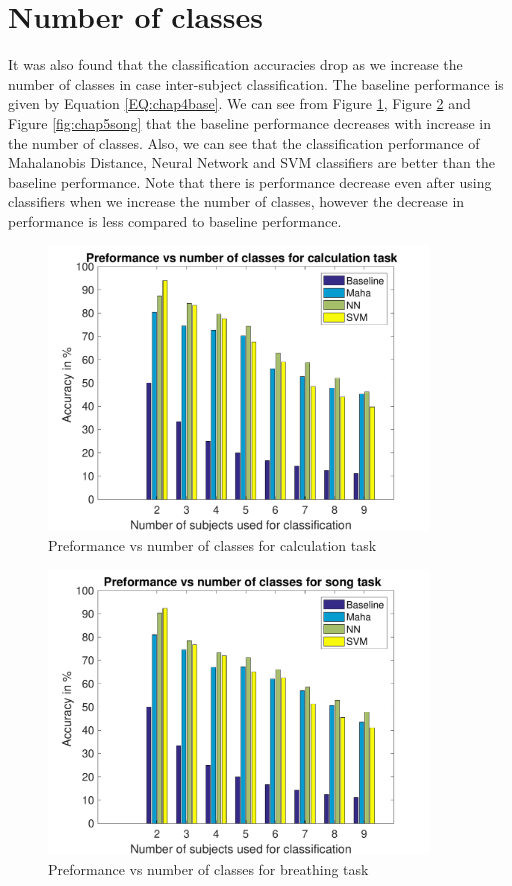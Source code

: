	\section{Number of classes}
		It was also found that the classification accuracies drop as we increase the number of classes in case inter-subject classification. The baseline performance is given by Equation \ref{EQ:chap4base}. We can see from Figure \ref{fig:chap5calc}, Figure \ref{fig:chap5breath} and Figure \ref{fig:chap5song} that the baseline performance decreases with increase in the number of classes. Also, we can see that the classification performance of Mahalanobis Distance, Neural Network and SVM classifiers are better than the baseline performance. Note that there is performance decrease even after using classifiers when we increase the number of classes, however the decrease in performance is less compared to baseline performance.
		\begin{figure}[hbtp]
	    	\centering
	    	\includegraphics[width=0.9\textwidth]{Chapter-5/calc_base}
	    	\caption{Preformance vs number of classes for calculation task}
	    	\label{fig:chap5calc}
	    \end{figure}
	    
		\begin{figure}[hbtp]
	    	\centering
	    	\includegraphics[width=0.9\textwidth]{Chapter-5/breath_base}
	    	\caption{Preformance vs number of classes for breathing task}
	    	\label{fig:chap5breath}
	    \end{figure}

